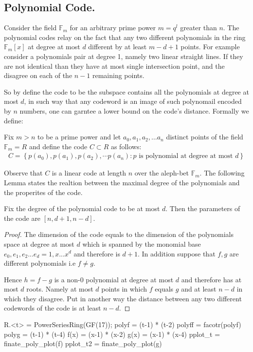 \subsection{Polynomial Code.} Consider the field $\mathbb{F}_{m}$ for an arbitrary prime power $m=q^{l}$ greater than $n$. The polynomial codes relay on the fact that any two different polynomials in the ring $\mathbb{F}_{m}\left[ x \right]$ at degree at most $d$ different by at least $m - d + 1$ points. For example consider a polynomials pair at degree 1, namely two linear straight lines. If they are not identical than they have at most single intersection point, and the disagree on each of the $n-1$ remaining points.  

So by define the code to be the subspace contains all the polynomials at degree at most $d$, in such way that any codeword is an image of such polynomail encoded by $n$ numbers, one can garntee a lower bound on the code's distance. Formally we define:     
\begin{definition}
  Fix $m > n $ to be a prime power and let $a_{0},a_{1},a_{2},\ldots a_{n}$ distinct points of the field $\mathbb{F}_{m} = R$  and define the code $C \subset R $ as follows:  
  \begin{equation*}
    \begin{split}
      C = \left\{p\left(a_{0}\right),p\left(a_{1}\right),p\left(a_{2}\right),\cdots p\left(a_{n}\right) : p \text{ is polynomial at degree at most } d \right\}
    \end{split}
  \end{equation*}
\end{definition}
Observe that $C$ is a linear code at length $n$ over the aleph-bet $\mathbb{F}_{m}$. The following Lemma states the realtion between the maximal degree of the polynomials and the properites of the code.   
\begin{lemma}
  Fix the degree of the polynomial code to be at most $d$. Then the parameters of the code are $[n,d + 1, n - d]$.  
  \label{polycode}
\end{lemma}
\begin{proof}
  The dimension of the code equals to the dimension of the polynomials space at degree at most $d$ which is spanned by the monomial base $e_{0}, e_{1}, e_{2} ... e_{d} = 1, x ... x^{d}$ and therefore is $d+1$. In addition suppose that $f,g$ are different polynomials i.e $f\neq g$.

  Hence $h = f-g$ is a non-$0$ polynomial at degree at most $d$ and therefore has at most $d$ roots. Namely at most $d$ points in which $f$ equals $g$ and at least $n-d$ in which they disagree. Put in another way the distance between any two different codewords of the code is at least $n-d$.  
\end{proof}
\begin{sagesilent}
R.<t> = PowerSeriesRing(GF(17));
polyf = (t-1) * (t-2)
polyff = facotr(polyf)
polyg = (t-1) * (t-4)
f(x) = (x-1) * (x-2)
g(x) = (x-1) * (x-4)
pplot_t = finate_poly_plot(f)
pplot_t2 = finate_poly_plot(g)
\end{sagesilent}

